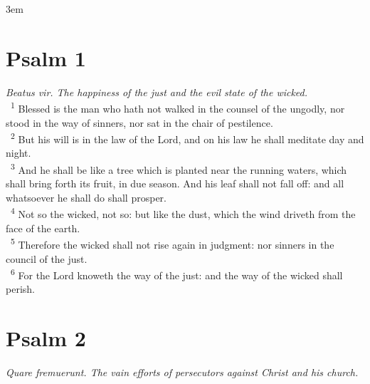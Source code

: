 \documentclass[a5paper,12pt]{article}
\date{}
\title{}
\begin{document}
\emergencystretch 3em
\begin{multicols*}{2}

\section{Psalm 1}
\label{sec:org3110d87}
\emph{Beatus vir. The happiness of the just and the evil state of the wicked.}\\

~\textsuperscript{1} Blessed is the man who hath not walked in the counsel of the ungodly, nor stood in the way of sinners, nor sat in the chair of pestilence.\\
~\textsuperscript{2} But his will is in the law of the Lord, and on his law he shall meditate day and night.\\
~\textsuperscript{3} And he shall be like a tree which is planted near the running waters, which shall bring forth its fruit, in due season. And his leaf shall not fall off: and all whatsoever he shall do shall prosper.\\
~\textsuperscript{4} Not so the wicked, not so: but like the dust, which the wind driveth from the face of the earth.\\
~\textsuperscript{5} Therefore the wicked shall not rise again in judgment: nor sinners in the council of the just.\\
~\textsuperscript{6} For the Lord knoweth the way of the just: and the way of the wicked shall perish.\\

\section{Psalm 2}
\label{sec:org70ac761}
\emph{Quare fremuerunt. The vain efforts of persecutors against Christ and his church.}\\


\end{multicols*}
\end{document}
